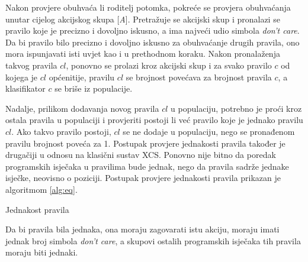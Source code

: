 \documentclass[times, utf8, zavrsni]{fer}
\begin{document}
Nakon provjere obuhvaća li roditelj potomka, pokreće se provjera obuhvaćanja unutar cijelog akcijskog skupa [\emph{A}].
Pretražuje se akcijski skup i pronalazi se pravilo koje je precizno i dovoljno iskusno, a ima najveći udio simbola \emph{don't care}.
Da bi pravilo bilo precizno i dovoljno iskusno za obuhvaćanje drugih pravila, ono mora ispunjavati isti uvjet kao i u prethodnom koraku.
Nakon pronalaženja takvog pravila $cl$, ponovno se prolazi kroz akcijski skup i za svako pravilo $c$ od kojega je $cl$ općenitije, pravilu $cl$ se brojnost povećava za brojnost pravila $c$, a klasifikator $c$ se briše iz populacije.

Nadalje, prilikom dodavanja novog pravila $cl$ u populaciju, potrebno je proći kroz ostala pravila u populaciji i provjeriti postoji li već pravilo koje je jednako pravilu $cl$.
Ako takvo pravilo postoji, $cl$ se ne dodaje u populaciju, nego se pronađenom pravilu brojnost poveća za 1.
Postupak provjere jednakosti pravila također je drugačiji u odnosu na klasični sustav XCS.
Ponovno nije bitno da poredak programskih isječaka u pravilima bude jednak, nego da pravila sadrže jednake isječke, neovisno o poziciji.
Postupak provjere jednakosti pravila prikazan je algoritmom \ref{alg:eq}.
\begin{algorithm}
    \caption{Jednakost pravila}
    \label{alg:eq}
    \begin{algorithmic}
        \ENDIF
        \ENDIF
        \ENDIF
    \end{algorithmic}
\end{algorithm}
Da bi pravila bila jednaka, ona moraju zagovarati istu akciju, moraju imati jednak broj simbola \emph{don't care}, a skupovi ostalih programskih isječaka tih pravila moraju biti jednaki.
\end{document}
